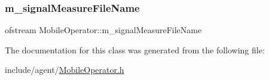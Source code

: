\mbox{\label{class_mobile_operator_af9c02c4088656c0f21ecc93b7023e776}} 
\subsubsection{\texorpdfstring{m\+\_\+signal\+Measure\+File\+Name}{m\_signalMeasureFileName}}
{\footnotesize\ttfamily ofstream Mobile\+Operator\+::m\+\_\+signal\+Measure\+File\+Name\hspace{0.3cm}{\ttfamily [private]}}



The documentation for this class was generated from the following file\+:\begin{DoxyCompactItemize}
\item 
include/agent/\hyperlink{_mobile_operator_8h}{Mobile\+Operator.\+h}\end{DoxyCompactItemize}
